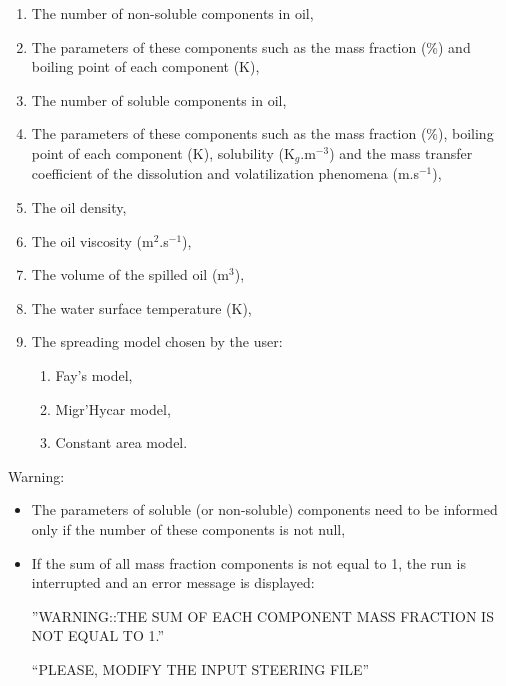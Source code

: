 \begin{enumerate}
\item  The number of non-soluble components in oil,

\item  The parameters of these components such as the mass fraction (\%) and boiling point of each component (K),

\item  The number of soluble components in oil,

\item  The parameters of these components such as the mass fraction (\%), boiling point of each component (K), solubility (K${}_{g}$.m${}^{-3}$) and the mass transfer coefficient of the dissolution and volatilization phenomena (m.s${}^{-1}$),

\item  The oil density,

\item  The oil viscosity (m${}^{2}$.s${}^{-1}$),

\item  The volume of the spilled oil (m${}^{3}$),

\item  The water surface temperature (K),

\item  The spreading model chosen by the user:

\begin{enumerate}
\item  Fay's model,

\item  Migr'Hycar model,

\item  Constant area model.
\end{enumerate}
\end{enumerate}

\begin{WarningBlock}{Warning:}
\begin{itemize}
\item The parameters of soluble (or non-soluble) components need to be informed only if the number of these components is not null,

\item  If the sum of all mass fraction components is not equal to 1, the run is interrupted and an error message is displayed:

 ''WARNING::THE SUM OF EACH COMPONENT MASS FRACTION IS NOT EQUAL TO 1.''

 ``PLEASE, MODIFY THE INPUT STEERING FILE''
\end{itemize}
\end{WarningBlock}

